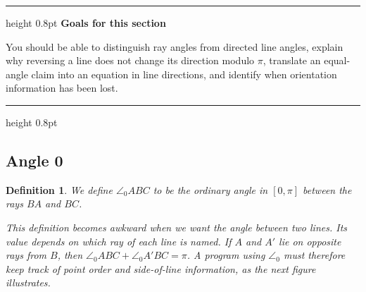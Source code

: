 \documentclass[reqno]{amsart}
\newenvironment{lecturebox}[1]{%
    \par\medskip
    \noindent\begingroup
    \setlength{\parindent}{0pt}
    \color{agblue}\hrule height 0.8pt\color{black}
    \smallskip
    \textbf{\color{agblue}#1}\par\smallskip
}{%
    \smallskip
    \color{agblue}\hrule height 0.8pt\color{black}
    \endgroup
    \medskip
}
\DeclareMathOperator{\1}{\textbf{1}}
\newtheorem{defn}[thm]{Definition}
\begin{document}
\begin{lecturebox}{Goals for this section}
You should be able to distinguish ray angles from directed line angles, explain
why reversing a line does not change its direction modulo $\pi$, translate an
equal-angle claim into an equation in line directions, and identify when
orientation information has been lost.
\end{lecturebox}

\subsection{Angle 0}

\begin{defn}
    We define $\angle_0 ABC$ to be the ordinary angle in $[0,\pi]$ between the
    rays $BA$ and $BC$.
    \begin{center}
    \end{center}
    This definition becomes awkward when we want the angle between two
    \emph{lines}. Its value depends on which ray of each line is named. If $A$
    and $A'$ lie on opposite rays from $B$, then
    $\angle_0ABC+\angle_0A'BC=\pi$. A program using $\angle_0$ must therefore
    keep track of point order and side-of-line information, as the next figure
    illustrates.

    \begin{center}
        \begin{tikzpicture}[scale=.5,
        point/.style={fill=blue, circle, minimum size=4pt, inner sep=0pt}]


\end{tikzpicture}
\end{center}
\end{defn}
\end{document}
